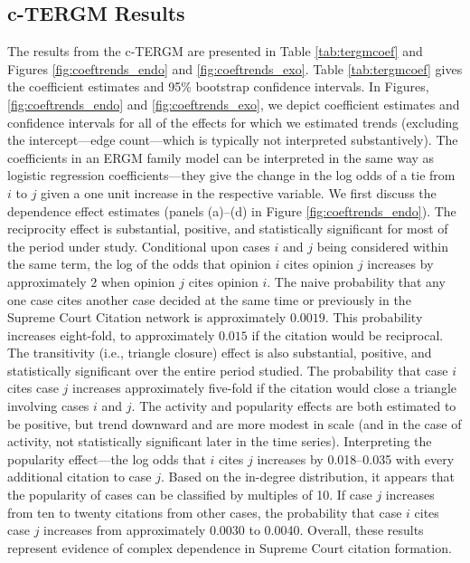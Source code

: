 \documentclass[headsepline=true, abstracton]{scrartcl}
\begin{document}
  
  
\subsection{c-TERGM Results}
The results from the c-TERGM are presented in Table \ref{tab:tergmcoef} and Figures \ref{fig:coeftrends_endo} and \ref{fig:coeftrends_exo}. Table \ref{tab:tergmcoef} gives the coefficient estimates and 95\% bootstrap confidence intervals. In Figures, \ref{fig:coeftrends_endo} and \ref{fig:coeftrends_exo}, we depict coefficient estimates and confidence intervals for all of the effects for which we estimated trends (excluding the intercept---edge count---which is typically not interpreted substantively). The coefficients in an ERGM family model can be interpreted in the same way as logistic regression coefficients---they give the change in the log odds of a tie from $i$ to $j$ given a one unit increase in the respective variable. We first discuss the dependence effect estimates (panels (a)--(d) in Figure \ref{fig:coeftrends_endo}). The reciprocity effect is substantial, positive, and statistically significant for most of the period under study. Conditional upon cases $i$ and $j$ being considered within the same term, the log of the odds that opinion $i$ cites opinion $j$ increases by approximately $2$ when opinion $j$ cites opinion $i$. The naive probability that any one case cites another case decided at the same time or previously in the Supreme Court Citation network is approximately $0.0019$. This probability increases eight-fold, to approximately $0.015$ if the citation would be reciprocal. The transitivity (i.e., triangle closure) effect is also substantial, positive, and statistically significant over the entire period studied. The probability that case $i$ cites case $j$ increases approximately five-fold if the citation would close a triangle involving cases $i$ and $j$. The activity and popularity effects are both estimated to be positive, but trend downward and are more modest in scale (and in the case of activity, not statistically significant later in the time series). Interpreting the popularity effect---the log odds that $i$ cites $j$ increases by 0.018--0.035 with every additional citation to case $j$. Based on the in-degree distribution, it appears that the popularity of cases can be classified by multiples of 10. If case $j$ increases from ten to twenty citations from other cases, the probability that case $i$ cites case $j$ increases from approximately 0.0030 to 0.0040. Overall, these results represent evidence of complex dependence in Supreme Court citation formation.
\end{document}
